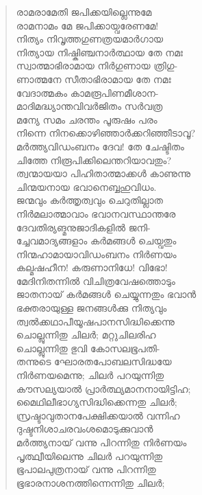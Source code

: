 \begin{verse}
രാമരാമേതി ജപിക്കയില്ലെന്നുമേ\\
രാമനാമം മേ ജപിക്കായ്വരേണമേ!\\
നിത്യം നിവൃത്തഗുണത്രയമാര്‍ഗായ\\
നിത്യായ നിഷ്കിഞ്ചനാര്‍ത്ഥായ തേ നമഃ\\
സ്വാത്മാഭിരാമായ നിര്‍ഗുണായ ത്രിഗു-\\
ണാത്മനേ സീതാഭിരാമായ തേ നമഃ\\
വേദാത്മകം കാമരൂപിണമീശാന-\\
മാദിമദ്ധ്യാന്തവിവര്‍ജിതം സര്‍വത്ര\\
മന്യേ സമം ചരന്തം പൂരുഷം പരം\\
നിന്നെ നിനക്കൊഴിഞ്ഞാര്‍ക്കറിഞ്ഞീടാവൂ?\\
മര്‍ത്ത്യവിഡംബനം ദേവ! തേ ചേഷ്ടിതം\\
ചിത്തേ നിരൂപിക്കിലെന്തറിയാവതും?\\
ത്വന്മായയാ പിഹിതാത്മാക്കള്‍ കാണുന്നു\\
ചിന്മയനായ ഭവാനെബ്ബഹുവിധം.\\
ജന്മവും കര്‍ത്തൃത്വവും ചെറുതില്ലാത\\
നിര്‍മലാത്മാവാം ഭവാനവസ്ഥാന്തരേ\\
ദേവതിര്യങ്മനുജാദികളില്‍ ജനി-\\
ച്ചേവമാദ്യങ്ങളാം കര്‍മങ്ങള്‍ ചെയ്വതും\\
നിന്മഹാമായാവിഡംബനം നിര്‍ണയം\\
കല്മഷഹീന! കരുണാനിധേ! വിഭോ!\\
മേദിനിതന്നില്‍ വിചിത്രവേഷത്തൊടും\\
ജാതനായ് കര്‍മങ്ങള്‍ ചെയ്യുന്നതും ഭവാന്‍\\
ഭക്തരായുള്ള ജനങ്ങള്‍ക്കു നിത്യവും\\
ത്വല്‍ക്കഥാപീയൂഷപാനസിദ്ധിക്കെന്നു\\
ചൊല്ലുന്നിതു ചിലര്‍; മറ്റുചിലരിഹ\\
ചൊല്ലുന്നിതു ഭുവി കോസലഭൂപതി-\\
തന്നുടെ ഘോരതപോബലസിദ്ധയേ\\
നിര്‍ണയമെന്നു; ചിലര്‍ പറയുന്നിതു\\
കൗസല്യയാല്‍ പ്രാര്‍ത്ഥ്യമാനനായിട്ടിഹ;\\
മൈഥിലീഭാഗ്യസിദ്ധിക്കെന്നതു ചിലര്‍;\\
സ്രഷ്ടാവുതാനപേക്ഷിക്കയാല്‍ വന്നിഹ\\
ദുഷ്ടനിശാചരവംശമൊടുക്കുവാന്‍\\
മര്‍ത്ത്യനായ് വന്നു പിറന്നിതു നിര്‍ണയം\\
പൃത്ഥ്വീയിലെന്നു ചിലര്‍ പറയുന്നിതു\\
ഭൂപാലപുത്രനായ് വന്നു പിറന്നിതു\\
ഭൂഭാരനാശനത്തിന്നെന്നിതു ചിലര്‍;\\

\end{verse}
